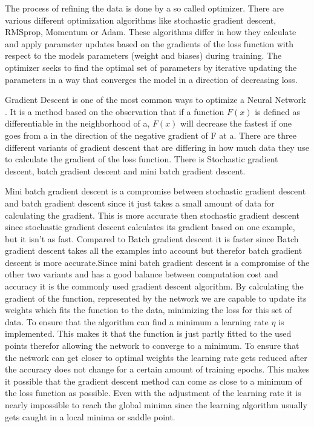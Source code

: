\documentclass[
a4paper, 
12pt,
grayscalebody, %
abstract=on,
twoside, BCOR10mm, 12pt, DIV13,headinclude, footexclude, final, abstracton, openright
]{ibireprt}
\numberwithin{equation}{chapter}
\numberwithin{table}{chapter}
\numberwithin{figure}{chapter}
\numberwithin{algorithm}{chapter}
\numberwithin{example}{chapter}
\numberwithin{example}{chapter}
\begin{document}

The process of refining the data is done by a so called optimizer. There are various different optimization algorithms like stochastic gradient descent, RMSprop, Momentum or Adam. These algorithms differ in how they calculate and apply parameter updates based on the gradients of the loss function with respect to the models parameters (weight and biases) during training. The optimizer  seeks to find the optimal set of parameters by iterative updating the parameters in a way that converges the model in a direction of decreasing loss.

Gradient Descent is one of the most common ways to optimize a Neural Network \cite{Ruder2016}. It is a method based on the observation that if a function $F(x)$ is defined as differentiable in the neighborhood of a, $F(x)$ will decrease the fastest if one goes from a in the direction of the negative gradient of F at a. There are three different variants of gradient descent that are differing in how much data they use to calculate the gradient of the loss function. There is Stochastic gradient descent, batch gradient descent and mini batch gradient descent. 

 
Mini batch gradient descent is a compromise between stochastic gradient descent and batch gradient descent since it just takes a small amount of data for calculating the gradient. This is more accurate then stochastic gradient descent since stochastic gradient descent calculates its gradient based on one example, but it isn't as fast. Compared to Batch gradient descent it is faster since Batch gradient descent takes all the examples into account but therefor batch gradient descent is more accurate.Since mini batch gradient descent is a compromise of the other two variants and has a good balance between computation cost and accuracy it is the commonly used gradient descent algorithm. By calculating the gradient of the function, represented by the network we are capable to update its weights which fits the function to the data, minimizing the loss for this set of data. To ensure that the algorithm can find a minimum a learning rate $\eta$ is implemented. This makes it that the function is just partly fitted to the used points therefor allowing the network to converge to a minimum. To ensure that the network can get closer to optimal weights the learning rate gets reduced after the accuracy does not change for a certain amount of training epochs.
This makes it possible that the gradient descent method can come as close to a minimum of the loss function as possible. Even with the adjustment of the learning rate it is nearly impossible to reach the global minima since the learning algorithm usually gets caught in a local minima or saddle point.
\end{document}
